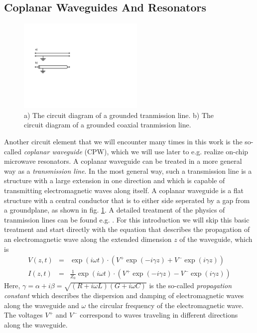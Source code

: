 \subsection{Coplanar Waveguides And Resonators}

\begin{figure}
	\includegraphics[width=6cm]{"./material/figures/introduction/transmission_lines"}
	\caption{a) The circuit diagram of a grounded tranmission line. b) The circuit diagram of a grounded coaxial tranmission line.}
	\label{fig:tline_schematic}
\end{figure}

Another circuit element that we will encounter many times in this work is the so-called {\it coplanar waveguide} (CPW), which we will use later to e.g. realize on-chip microwave resonators. A coplanar waveguide can be treated in a more general way as a {\it transmission line}. In the most general way, such a transmission line is a structure with a large extension in one direction and which is capable of transmitting electromagnetic waves along itself. A coplanar waveguide is a flat structure with a central conductor that is to either side seperated by a gap from a groundplane, as shown in fig. \ref{fig:tline_schematic}. A detailed treatment of the physics of tranmission lines can be found e.g. \cite{pozar_microwave_2011}. For this introduction we will skip this basic treatment and start directly with the equation that describes the propagation of an electromagnetic wave along the extended dimension $z$ of the waveguide, which is
%
\begin{eqnarray}
V(z,t) & = & \exp{\left(i\omega t\right)}\cdot\left(V^+ \exp{\left(-i\gamma z\right)}+V^-\exp{\left(i\gamma z\right)}\right) \\
I(z,t) & = & \frac{1}{Z_0}\exp{\left(i\omega t\right)}\cdot\left(V^+ \exp{\left(-i\gamma z\right)}-V^-\exp{\left(i\gamma z\right)}\right)
\end{eqnarray}
%
Here, $\gamma = \alpha+i\beta = \sqrt{(R+i\omega L)(G+i\omega C)}$ is the so-called {\it propagation constant} which describes the dispersion and damping of electromagnetic waves along the waveguide and $\omega$ the circular frequency of the electromagnetic wave. The voltages $V^+$ and $V^-$ correspond to waves traveling in different directions along the waveguide.

